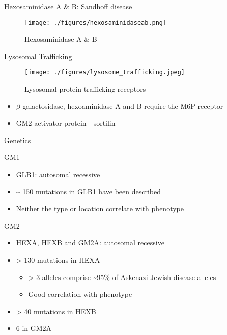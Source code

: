 \documentclass[presentation, smaller]{beamer}
\begin{document}
\begin{frame}[label={sec:orgheadline9}]{Hexosaminidase A \& B: Sandhoff disease}
\begin{figure}[htb]
\centering
\texttt{[image: ./figures/hexosaminidaseab.png]}
\caption[hexb]{\label{fig:hexb}
Hexosaminidase A \& B}
\end{figure}
\end{frame}



\begin{frame}[label={sec:orgheadline10}]{Lysosomal Trafficking}
\begin{figure}[htb]
\centering
\texttt{[image: ./figures/lysosome\_trafficking.jpeg]}
\caption[traf]{\label{fig:traf}
Lysosomal protein trafficking receptors}
\end{figure}

\footnotesize
\begin{itemize}
\item \(\beta\)-galactosidase, hexoaminidase A and B require the M6P-receptor
\item GM2 activator protein - sortilin
\end{itemize}
\end{frame}


\begin{frame}[label={sec:orgheadline11}]{Genetics}
\begin{block}{GM1}
\begin{itemize}
\item GLB1: autosomal recessive
\item \textasciitilde{} 150 mutations in GLB1 have been described
\item Neither the type or location correlate with phenotype
\end{itemize}
\end{block}

\begin{block}{GM2}
\begin{itemize}
\item HEXA, HEXB and GM2A: autosomal recessive
\item > 130 mutations in HEXA
\begin{itemize}
\item > 3 alleles comprise \textasciitilde{}95\% of Askenazi Jewish disease alleles
\item Good correlation with phenotype
\end{itemize}
\item > 40 mutations in HEXB
\item 6 in GM2A
\end{itemize}
\end{block}
\end{frame}
\end{document}
